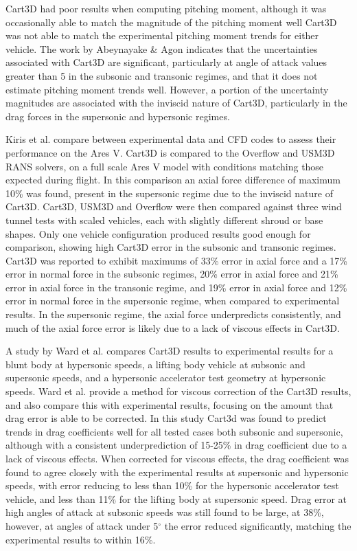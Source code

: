 Cart3D had poor results when computing pitching moment, although it was occasionally able to match the magnitude of the pitching moment well Cart3D was not able to match the experimental pitching moment trends for either vehicle\cite{Abeynayake2013a}. The work by Abeynayake \& Agon indicates that the uncertainties associated with Cart3D are significant, particularly at angle of attack values greater than 5 in the subsonic and transonic regimes, and that it does not estimate pitching moment trends well. However, a portion of the uncertainty magnitudes are associated with the inviscid nature of Cart3D, particularly in the drag forces in the supersonic and hypersonic regimes.

Kiris et al. compare between experimental data and CFD codes to assess their performance on the Ares V\cite{Kiris2011}. Cart3D is compared to the Overflow and USM3D RANS solvers, on a full scale Ares V model with conditions matching those expected during flight. In this comparison an axial force difference of maximum 10\% was found, present in the supersonic regime due to the inviscid nature of Cart3D\cite{Kiris2011}. Cart3D, USM3D and Overflow were then compared against three wind tunnel tests with scaled vehicles, each with slightly different shroud or base shapes. Only one vehicle configuration produced results good enough for comparison\cite{Kiris2011}, showing high Cart3D error in the subsonic and transonic regimes. Cart3D was reported to exhibit maximums of 33\% error in axial force and a 17\% error in normal force in the subsonic regimes, 20\% error in axial force and 21\% error in axial force in the transonic regime, and 19\% error in axial force and 12\% error in normal force in the supersonic regime, when compared to experimental results. In the supersonic regime, the axial force underpredicts consistently, and much of the axial force error is likely due to a lack of viscous effects in Cart3D. 

A study by Ward et al.\cite{Ward2018} compares Cart3D results to experimental results for a blunt body at hypersonic speeds, a lifting body vehicle at subsonic and supersonic speeds, and a hypersonic accelerator test geometry at hypersonic speeds. Ward et al. provide a method for viscous correction of the Cart3D results, and also compare this with experimental results, focusing on the amount that drag error is able to be corrected. In this study Cart3d was found to predict trends in drag coefficients well for all tested cases both subsonic and supersonic, although with a consistent underprediction of 15-25\% in drag coefficient due to a lack of viscous effects\cite{Ward2018}. When corrected for viscous effects, the drag coefficient was found to agree closely with the experimental results at supersonic and hypersonic speeds, with error reducing to less than 10\% for the hypersonic accelerator test vehicle, and less than 11\% for the lifting body at supersonic speed\cite{Ward2018}. Drag error at high angles of attack at subsonic speeds was still found to be large, at 38\%, however, at angles of attack under 5$^\circ$ the error reduced significantly, matching the experimental results to within 16\%. 


